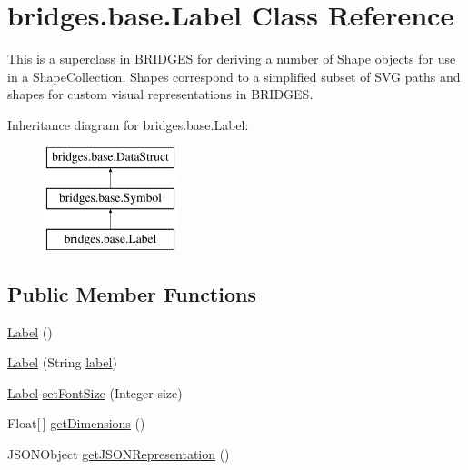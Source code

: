 \hypertarget{classbridges_1_1base_1_1_label}{}\section{bridges.\+base.\+Label Class Reference}
\label{classbridges_1_1base_1_1_label}


This is a superclass in B\+R\+I\+D\+G\+E\+S for deriving a number of Shape objects for use in a Shape\+Collection. Shapes correspond to a simplified subset of S\+V\+G paths and shapes for custom visual representations in B\+R\+I\+D\+G\+E\+S.  


Inheritance diagram for bridges.\+base.\+Label\+:\begin{figure}[H]
\begin{center}
\leavevmode
\includegraphics[height=3.000000cm]{classbridges_1_1base_1_1_label}
\end{center}
\end{figure}
\subsection*{Public Member Functions}
\begin{DoxyCompactItemize}
\item 
\hyperlink{classbridges_1_1base_1_1_label_adaed1c29dc02eb0f77d772b256b9eae4}{Label} ()
\item 
\hyperlink{classbridges_1_1base_1_1_label_a0ffb2cdafae3f2c21e0925f2fe23df87}{Label} (String \hyperlink{classbridges_1_1base_1_1_symbol_ad2adcc82e6a96c2f3c465702502655e9}{label})
\item 
\hyperlink{classbridges_1_1base_1_1_label}{Label} \hyperlink{classbridges_1_1base_1_1_label_ab5f2d60e519db2499f326c4ccb967b25}{set\+Font\+Size} (Integer size)
\item 
Float\mbox{[}$\,$\mbox{]} \hyperlink{classbridges_1_1base_1_1_label_a9df9f801df020ba601a7bd33f38b4b0f}{get\+Dimensions} ()
\item 
J\+S\+O\+N\+Object \hyperlink{classbridges_1_1base_1_1_label_a6befc6655ce36868213be289571c6315}{get\+J\+S\+O\+N\+Representation} ()
\end{DoxyCompactItemize}
